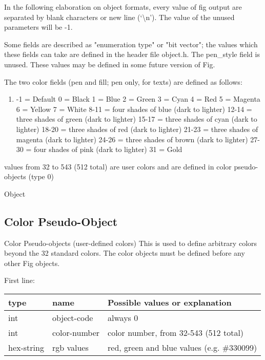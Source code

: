 \documentclass[10pt, a4paper]{article}
\begin{document}
In the following elaboration on object formats, 
every value of fig output are separated by blank characters 
or new line (`\textbackslash n').  
The value of the unused parameters will be -1.

 Some fields are described as "enumeration type" or "bit vector"; the
 values which these fields can take are defined in the header file object.h.
 The pen\_style field is unused.
 These values may be defined in some future version of Fig.


The two color fields (pen and fill; pen only, for texts) are defined as follows:
%
\begin{enumerate}
\item
            -1 = Default
             0 = Black
             1 = Blue
             2 = Green
             3 = Cyan
             4 = Red
             5 = Magenta
             6 = Yellow
             7 = White
          8-11 = four shades of blue (dark to lighter)
         12-14 = three shades of green (dark to lighter)
         15-17 = three shades of cyan (dark to lighter)
         18-20 = three shades of red (dark to lighter)
         21-23 = three shades of magenta (dark to lighter)
         24-26 = three shades of brown (dark to lighter)
         27-30 = four shades of pink (dark to lighter)
            31 = Gold
\end{enumerate}

values from 32 to 543 (512 total) are user colors and
are defined in color pseudo-objects (type 0)


Object

\setcounter{subsection}{-1}
\subsection{Color Pseudo-Object}\label{subsec:colorPseudoObj}

Color Pseudo-objects (user-defined colors)
          This is used to define arbitrary colors beyond the 32 standard colors.
          The color objects must be defined before any other Fig objects.


    First line:

\begin{tabular}{|lll|}
\hline
type & name & Possible values or explanation \\
\hline
\hline
int        & object-code    & always 0\\
int        & color-number   & color number, from 32-543 (512 total)\\
hex-string & rgb values     & red, green and blue values (e.g. \#330099) \\
\hline
\end{tabular}
\end{document}
